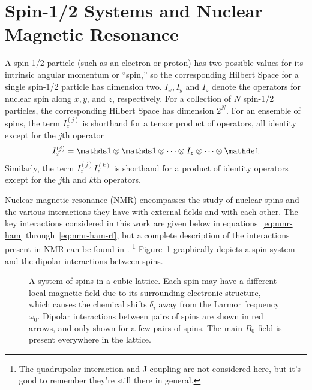 \section{Spin-1/2 Systems and Nuclear Magnetic Resonance}

A spin-1/2 particle (such as an electron or proton) has two possible values for its intrinsic angular momentum or ``spin,'' so the corresponding Hilbert Space for a single spin-1/2 particle has dimension two. $I_x, I_y$ and $I_z$ denote the operators for nuclear spin along $x, y$, and $z$, respectively. For a collection of $N$ spin-1/2 particles, the corresponding Hilbert Space has dimension $2^N$.
For an ensemble of spins, the term $I_z^{(j)}$ is shorthand for a tensor product of operators, all identity except for the $j$th operator
\[
I_z^{(j)} = \identity \otimes \identity \otimes \dots \otimes I_z \otimes \dots \otimes \identity
\]
Similarly, the term $I_z^{(j)}I_z^{(k)}$ is shorthand for a product of identity operators except for the $j$th and $k$th operators.

Nuclear magnetic resonance (NMR) encompasses the study of nuclear spins and the various interactions they have with external fields and with each other.
The key interactions considered in this work are given below in equations~\ref{eq:nmr-ham} through~\ref{eq:nmr-ham-rf}, but a complete description of the interactions present in NMR can be found in \cite{1976ii}.%
\footnote{The quadrupolar interaction and J coupling are not considered here, but it's good to remember they're still there in general.}
Figure~\ref{fig:spin-system} graphically depicts a spin system and the dipolar interactions between spins.

\begin{figure}[H]
    \centering
    
    \caption{A system of spins in a cubic lattice. Each spin may have a different local magnetic field due to its surrounding electronic structure, which causes the chemical shifts $\delta_i$ away from the Larmor frequency $\omega_0$. Dipolar interactions between pairs of spins are shown in red arrows, and only shown for a few pairs of spins. The main $B_0$ field is present everywhere in the lattice.}
    \label{fig:spin-system}
\end{figure}

